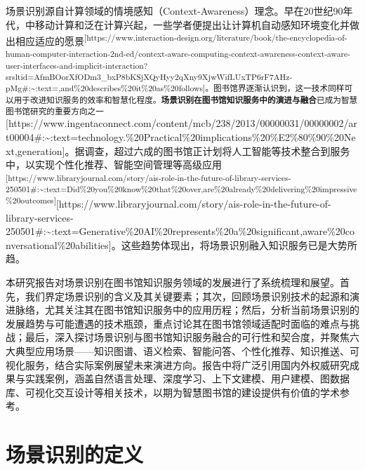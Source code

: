 \documentclass[
  letterpaper,
]{scrbook}
\begin{document}
场景识别源自计算领域的情境感知（Context-Awareness）理念。早在20世纪90年代，中移动计算和泛在计算兴起，一些学者便提出让计算机自动感知环境变化并做出相应适应的愿景\textsuperscript{{[}https://www.interaction-design.org/literature/book/the-encyclopedia-of-human-computer-interaction-2nd-ed/context-aware-computing-context-awareness-context-aware-user-interfaces-and-implicit-interaction?srsltid=AfmBOorXfODm3\_bxP8bKSjXQyHyy2qXny9XjwWifLUxTP6rF7AHz-pMg\#:\textasciitilde:text=,and\%20describes\%20it\%20as\%20follows{]}。图书馆界逐渐认识到，这一技术同样可以用于改进知识服务的效率和智慧化程度。\textbf{场景识别在图书馆知识服务中的演进与融合}已成为智慧图书馆研究的重要方向之一}{[}https://www.ingentaconnect.com/content/mcb/238/2013/00000031/00000002/art00004\#:\textasciitilde:text=technology.\%20Practical\%20implications\%20\%E2\%80\%90\%20Next,generation{]}。据调查，超过六成的图书馆正计划将人工智能等技术整合到服务中，以实现个性化推荐、智能空间管理等高级应用\textsuperscript{{[}https://www.libraryjournal.com/story/ais-role-in-the-future-of-library-services-250501\#:\textasciitilde:text=Did\%20you\%20know\%20that\%20over,are\%20already\%20delivering\%20impressive\%20outcomes{]}}{[}https://www.libraryjournal.com/story/ais-role-in-the-future-of-library-services-250501\#:\textasciitilde:text=Generative\%20AI\%20represents\%20a\%20significant,aware\%20conversational\%20abilities{]}。这些趋势体现出，将场景识别融入知识服务已是大势所趋。

本研究报告对场景识别在图书馆知识服务领域的发展进行了系统梳理和展望。首先，我们界定场景识别的含义及其关键要素；其次，回顾场景识别技术的起源和演进脉络，尤其关注其在图书馆知识服务中的应用历程；然后，分析当前场景识别的发展趋势与可能遭遇的技术瓶颈，重点讨论其在图书馆领域适配时面临的难点与挑战；最后，深入探讨场景识别与图书馆知识服务融合的可行性和契合度，并聚焦六大典型应用场景------知识图谱、语义检索、智能问答、个性化推荐、知识推送、可视化服务，结合实际案例展望未来演进方向。报告中将广泛引用国内外权威研究成果与实践案例，涵盖自然语言处理、深度学习、上下文建模、用户建模、图数据库、可视化交互设计等相关技术，以期为智慧图书馆的建设提供有价值的学术参考。

\section{场景识别的定义}\label{ux573aux666fux8bc6ux522bux7684ux5b9aux4e49}
\end{document}

